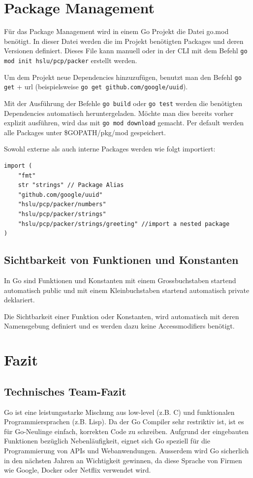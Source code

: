 \documentclass[11pt]{article}
\begin{document}
\section{Package Management}
Für das Package Management wird in einem Go Projekt die Datei go.mod benötigt. In dieser Datei werden die im Projekt benötigten Packages und deren Versionen definiert.
Dieses File kann manuell oder in der CLI mit dem Befehl \lstinline[language=bash]{go mod init hslu/pcp/packer} erstellt werden.

Um dem Projekt neue Dependencies hinzuzufügen, benutzt man den Befehl \lstinline[language=bash]{go get} + url (beispielsweise \lstinline[language=bash]{go get github.com/google/uuid}).

Mit der Ausführung der Befehle \lstinline[language=bash]{go build} oder \lstinline[language=bash]{go test} werden die benötigten Dependencies automatisch heruntergeladen. Möchte man dies bereits vorher explizit ausführen, wird das mit \lstinline[language=bash]{go mod download} gemacht. Per default werden alle Packages unter \$GOPATH/pkg/mod gespeichert. 

Sowohl externe als auch interne Packages werden wie folgt importiert:

\begin{lstlisting}
import (
	"fmt"
	str "strings" // Package Alias
	"github.com/google/uuid"
	"hslu/pcp/packer/numbers"
	"hslu/pcp/packer/strings"
	"hslu/pcp/packer/strings/greeting" //import a nested package
)
\end{lstlisting}
\subsection{Sichtbarkeit von Funktionen und Konstanten}
In Go sind Funktionen und Konstanten  mit einem Grossbuchstaben startend automatisch public und mit einem Kleinbuchstaben startend automatisch private deklariert.

Die Sichtbarkeit einer Funktion oder Konstanten, wird automatisch mit deren Namensgebung definiert und es werden dazu keine Accessmodifiers benötigt.




\section{Fazit}

\subsection{Technisches Team-Fazit}
Go ist eine leistungsstarke Mischung aus low-level (z.B. C) und funktionalen Programmiersprachen (z.B. Lisp). Da der Go Compiler sehr restriktiv ist, ist es für Go-Neulinge einfach, korrekten Code zu schreiben. Aufgrund der eingebauten Funktionen bezüglich Nebenläufigkeit, eignet sich Go speziell für die Programmierung von APIs und Webanwendungen. Ausserdem wird Go sicherlich in den nächsten Jahren an Wichtigkeit gewinnen, da diese Sprache von Firmen wie Google, Docker oder Netflix verwendet wird.
\end{document}
